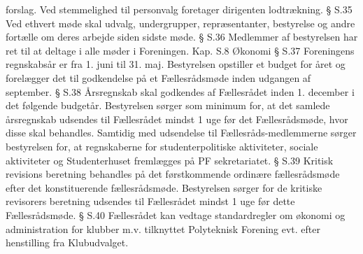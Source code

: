              forslag. Ved stemmelighed til personvalg foretager dirigenten lodtrækning.
§ S.35 Ved ethvert møde skal udvalg, undergrupper, repræsentanter, bestyrelse og andre fortælle om deres arbejde
          siden sidste møde.
§ S.36 Medlemmer af bestyrelsen har ret til at deltage i alle møder i Foreningen.
Kap. S.8 Økonomi
§ S.37 Foreningens regnskabsår er fra 1. juni til 31. maj.
        Bestyrelsen opstiller et budget for året og forelægger det til godkendelse på et Fællesrådsmøde inden
             udgangen af september.
§ S.38 Årsregnskab skal godkendes af Fællesrådet inden 1. december i det følgende budgetår.
            Bestyrelsen sørger som minimum for, at det samlede årsregnskab udsendes til Fællesrådet mindst 1 uge før
                det Fællesrådsmøde, hvor disse skal behandles.
                  Samtidig med udsendelse til Fællesråds-medlemmerne sørger bestyrelsen for, at regnskaberne for
                    studenterpolitiske aktiviteter, sociale aktiviteter og Studenterhuset fremlægges på PF sekretariatet.
§ S.39 Kritisk revisions beretning behandles på det førstkommende ordinære fællesrådsmøde efter det
             konstituerende fællesrådsmøde. Bestyrelsen sørger for de kritiske revisorers beretning udsendes til
                Fællesrådet mindst 1 uge før dette Fællesrådsmøde.
§ S.40 Fællesrådet kan vedtage standardregler om økonomi og administration for klubber m.v. tilknyttet Polyteknisk
          Forening evt. efter henstilling fra Klubudvalget.
